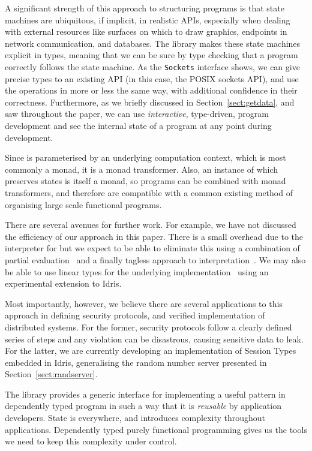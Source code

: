 A significant strength of this approach to structuring 
programs is that state machines are ubiquitous, if implicit, in realistic APIs,
especially when dealing with external resources like surfaces on which to draw
graphics, endpoints in network communication, and databases.  The \states{}
library makes these state machines explicit in types, meaning
that we can be sure by type checking that a program correctly follows the state
machine.  As the \texttt{Sockets} interface shows, we can give precise types to
an existing API (in this case, the POSIX sockets API), and use the operations
in more or less the same way, with additional confidence in their correctness.
%
Furthermore, as we briefly discussed in Section~\ref{sect:getdata}, and 
saw throughout the paper, we can use \emph{interactive}, type-driven, program
development and see the internal state of a program at any point during
development.

Since \states{} is parameterised by an underlying computation context, which is
most commonly a monad, it is a monad transformer.  Also, an instance of
\states{} which preserves states is itself a monad, so \states{} programs can
be combined with monad transformers, and therefore are compatible with a common
existing method of organising large scale functional programs.

There are several avenues for further work.  For example, we have not discussed
the efficiency of our approach in this paper. There is a small overhead due to
the interpreter for \states{} but we expect to be able to eliminate this using
a combination of partial evaluation~\citep{scrap-engine} and a finally tagless
approach to interpretation~\citep{Carette2009}. We may also be able to use
linear types for the underlying implementation~\citep{McBride2016} using an
experimental extension to Idris.

Most importantly, however, we believe there are several applications to
this approach in defining security protocols, and verified implementation
of distributed systems. For the former, security protocols follow a clearly
defined series of steps and any violation can be disastrous, causing
sensitive data to leak.
%
For the latter, we are currently developing an implementation of Session
Types~\citep{Honda93,Honda08} embedded in Idris, generalising the random
number server presented in Section~\ref{sect:randserver}.

The \states{} library provides a generic interface for implementing a useful
pattern in dependently typed program in such a way that it is \emph{reusable}
by application developers. State is everywhere, and introduces complexity
throughout applications. Dependently typed purely functional programming gives
us the tools we need to keep this complexity under control.
